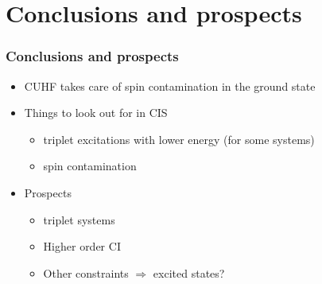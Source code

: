 \documentclass[aspectratio=169]{beamer}
\begin{document}
\section{Conclusions and prospects}
\begin{frame}
    \frametitle{Conclusions and prospects}
    \begin{itemize}
        \item CUHF takes care of spin contamination in the ground state
        \item Things to look out for in CIS
        \begin{itemize}
            \item triplet excitations with lower energy (for some systems)
            \item spin contamination
        \end{itemize}
        \item Prospects
        \begin{itemize}
            \item triplet systems
            \item Higher order CI
            \item Other constraints $\Longrightarrow$ excited states?
        \end{itemize}
    \end{itemize}
    
\end{frame}

\titleframe
\end{document}
